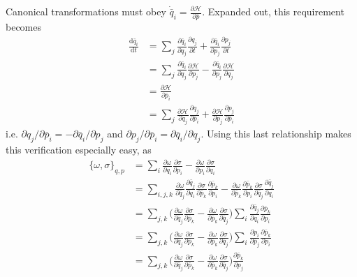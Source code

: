 \documentclass[../principles-of-quantum-mechanics.tex]{subfiles}
\begin{document}
\begin{questions}
		\begin{solution}
			Canonical transformations must obey $\dot{\bar{q}}_i = \frac{\partial\mathcal{H}}{\partial \bar{p}}$. Expanded out, this requirement becomes
			\begin{align*}
				\frac{\mathrm{d} \bar{q}_i}{\mathrm{d} t} &= \sum_j\frac{\partial \bar{q}_i}{\partial q_j}\frac{\partial q_j}{\partial t} + \frac{\partial\bar{q}_i}{\partial p_j}\frac{\partial p_j}{\partial t} \\
				&= \sum_j\frac{\partial \bar{q}_i}{\partial q_j}\frac{\partial \mathcal{H}}{\partial p_j} - \frac{\partial\bar{q}_i}{\partial p_j}\frac{\partial \mathcal{H}}{\partial q_j} \\
				&= \frac{\partial \mathcal{H}}{\partial \bar{p}_i} \\
			    &= \sum_j\frac{\partial\mathcal{H}}{\partial q_j}\frac{\partial q_j}{\partial\bar{p}_i} + \frac{\partial\mathcal{H}}{\partial p_j}\frac{\partial p_j}{\partial \bar{p}_i}
			\end{align*}
			i.e. $\partial q_j/\partial \bar{p}_i = -\partial \bar{q}_i/\partial p_j$ and $\partial p_j/\partial \bar{p}_i = \partial\bar{q}_i/\partial q_j$. Using this last relationship makes this verification especially easy, as
			\begin{align*}
				\{\omega, \sigma\}_{q,p} &= \sum_i\frac{\partial\omega}{\partial q_i}\frac{\partial\sigma}{\partial p_i} - \frac{\partial\omega}{\partial p_i}\frac{\partial\sigma}{\partial q_i} \\
				&= \sum_{i, j, k}\frac{\partial\omega}{\partial \bar{q}_j}\frac{\partial\bar{q}_j}{\partial q_i}\frac{\partial\sigma}{\partial \bar{p}_k}\frac{\partial\bar{p}_k}{\partial p_i} - \frac{\partial\omega}{\partial \bar{p}_k}\frac{\partial\bar{p}_k}{\partial p_i}\frac{\partial\sigma}{\partial \bar{q}_j}\frac{\partial\bar{q}_j}{\partial q_i} \\
				&= \sum_{j, k}\Big(\frac{\partial\omega}{\partial \bar{q}_j}\frac{\partial\sigma}{\partial \bar{p}_k} - \frac{\partial\omega}{\partial \bar{p}_k}\frac{\partial\sigma}{\partial \bar{q}_j}\Big)\sum_i\frac{\partial\bar{q}_j}{\partial q_i}\frac{\partial\bar{p}_k}{\partial p_i} \\
				&= \sum_{j, k}\Big(\frac{\partial\omega}{\partial \bar{q}_j}\frac{\partial\sigma}{\partial \bar{p}_k} - \frac{\partial\omega}{\partial \bar{p}_k}\frac{\partial\sigma}{\partial \bar{q}_j}\Big)\sum_i\frac{\partial{p}_i}{\partial \bar{p}_j}\frac{\partial\bar{p}_k}{\partial p_i} \\
				&= \sum_{j, k}\Big(\frac{\partial\omega}{\partial \bar{q}_j}\frac{\partial\sigma}{\partial \bar{p}_k} - \frac{\partial\omega}{\partial \bar{p}_k}\frac{\partial\sigma}{\partial \bar{q}_j}\Big)\frac{\partial\bar{p}_k}{\partial p_j} \\

\end{align*}
\end{solution}
\end{questions}
\end{document}
